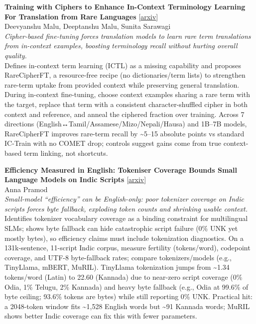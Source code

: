 \documentclass[12pt,letterpaper]{article}
\begin{document}
\medskip

{\small\textbf{Training with Ciphers to Enhance In-Context Terminology Learning For Translation from Rare Languages}} {\scriptsize[\href{https://arxiv.org/abs/2610.24593}{arxiv}]}\\
{\scriptsize Deevyanshu Malu, Deeptanshu Malu, Sunita Sarawagi}\\

{\small\textit{Cipher-based fine-tuning forces translation models to learn rare term translations from in-context examples, boosting terminology recall without hurting overall quality.}}\\[1pt]
{\footnotesize Defines in-context term learning (ICTL) as a missing capability and proposes RareCipherFT, a resource-free recipe (no dictionaries/term lists) to strengthen rare-term uptake from provided context while preserving general translation. During in-context fine-tuning, choose context examples sharing a rare term with the target, replace that term with a consistent character-shuffled cipher in both context and reference, and anneal the ciphered fraction over training. Across 7 directions (English↔Tamil/Assamese/Mizo/Nepali/Hausa) and 1B--7B models, RareCipherFT improves rare-term recall by \textasciitilde{}5--15 absolute points vs standard IC-Train with no COMET drop; controls suggest gains come from true context-based term linking, not shortcuts.}

\medskip

{\small\textbf{Efficiency Measured in English: Tokeniser Coverage Bounds Small Language Models on Indic Scripts}} {\scriptsize[\href{https://arxiv.org/abs/2610.24818}{arxiv}]}\\
{\scriptsize Anna Pramod}\\

{\small\textit{Small-model ``efficiency'' can be English-only: poor tokenizer coverage on Indic scripts forces byte fallback, exploding token counts and shrinking usable context.}}\\[1pt]
{\footnotesize Identifies tokenizer vocabulary coverage as a binding constraint for multilingual SLMs; shows byte fallback can hide catastrophic script failure (0\% UNK yet mostly bytes), so efficiency claims must include tokenization diagnostics. On a 131k-sentence, 11-script Indic corpus, measure fertility (tokens/word), codepoint coverage, and UTF-8 byte-fallback rates; compare tokenizers/models (e.g., TinyLlama, mBERT, MuRIL). TinyLlama tokenization jumps from \textasciitilde{}1.34 tokens/word (Latin) to 22.60 (Kannada) due to near-zero script coverage (0\% Odia, 1\% Telugu, 2\% Kannada) and heavy byte fallback (e.g., Odia at 99.6\% of byte ceiling; 93.6\% tokens are bytes) while still reporting 0\% UNK. Practical hit: a 2048-token window fits \textasciitilde{}1,528 English words but \textasciitilde{}91 Kannada words; MuRIL shows better Indic coverage can fix this with fewer parameters.}
\end{document}
